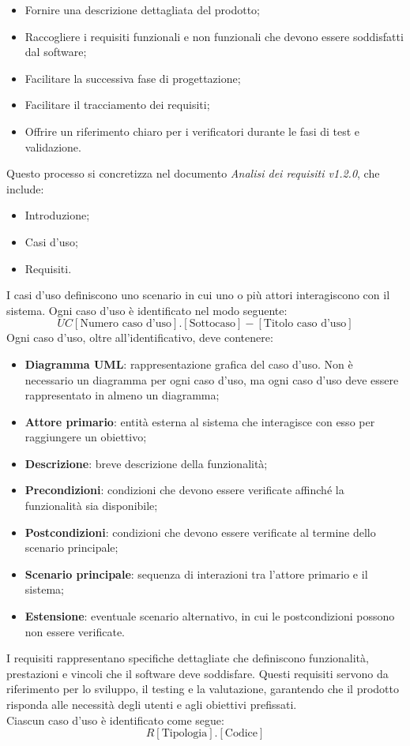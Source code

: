 \begin{itemize}
    \item Fornire una descrizione dettagliata del prodotto;
    \item Raccogliere i requisiti funzionali e non funzionali che devono essere
          soddisfatti dal software;
    \item Facilitare la successiva fase di progettazione;
    \item Facilitare il tracciamento dei requisiti;
    \item Offrire un riferimento chiaro per i verificatori durante le fasi di test e
          validazione.
\end{itemize}

Questo processo si concretizza nel documento \textit{Analisi dei requisiti v1.2.0},
che include:
\begin{itemize}
    \item Introduzione;
    \item Casi d'uso;
    \item Requisiti.
\end{itemize}
\label{inf:UC}
I casi d'uso definiscono uno scenario in cui uno o più attori interagiscono con il sistema. Ogni caso d'uso è
identificato nel modo seguente:
\textbf{
\[
    UC[\text{Numero caso d'uso}].[\text{Sottocaso}] - [\text{Titolo caso d'uso}]
\]
}
Ogni caso d'uso, oltre all'identificativo, deve contenere:
\begin{itemize}
    \item \textbf{Diagramma UML}: rappresentazione grafica del caso d'uso. Non è necessario un diagramma per ogni caso d'uso,
          ma ogni caso d'uso deve essere rappresentato in almeno un diagramma;
    \item \textbf{Attore primario}: entità esterna al sistema che interagisce con esso per raggiungere un obiettivo;
    \item \textbf{Descrizione}: breve descrizione della funzionalità;
    \item \textbf{Precondizioni}: condizioni che devono essere verificate affinché la funzionalità sia disponibile;
    \item \textbf{Postcondizioni}: condizioni che devono essere verificate al termine dello scenario principale;
    \item \textbf{Scenario principale}: sequenza di interazioni tra l'attore primario e il sistema;
    \item \textbf{Estensione}: eventuale scenario alternativo, in cui le postcondizioni possono non essere verificate.
\end{itemize}
\label{inf:reqs}
I requisiti rappresentano specifiche dettagliate che definiscono funzionalità, prestazioni e vincoli che il
software deve soddisfare. Questi requisiti servono da riferimento per lo sviluppo, il testing e la valutazione,
garantendo che il prodotto risponda alle necessità degli utenti e agli obiettivi prefissati.\\
Ciascun caso d'uso è identificato come segue:
\textbf{
\[
    R[\text{Tipologia}].[ \text{Codice}]
\]
}

